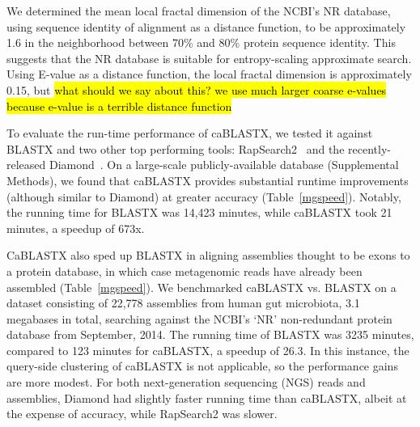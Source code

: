 \documentclass[review,preprint,12pt]{elsarticle}
\renewcommand{\cite}{\citep} %
\theoremstyle{definition}
\theoremstyle{remark}
\numberwithin{equation}{section}
\begin{document}
We determined the mean local fractal dimension of the NCBI's NR database, using 
sequence identity of alignment as a distance function, to be approximately 1.6 
in the neighborhood between 70\% and 80\% protein sequence identity.
This suggests that the NR database is suitable for entropy-scaling approximate
search.
Using E-value as a distance function, the local fractal dimension is 
approximately 0.15, but \hl{what should we say about this? we use much larger coarse e-values because e-value is a terrible distance function}

To evaluate the run-time performance of caBLASTX, we tested it against
BLASTX and two other top performing tools: RapSearch2~\cite{zhao2012rapsearch2} and the recently-released
Diamond~\cite{buchfink2014fast}.
On a large-scale publicly-available database (Supplemental Methods), we found that caBLASTX provides substantial runtime improvements 
(although similar to Diamond) at greater accuracy (Table~\ref{mgspeed}).
Notably, the running time for BLASTX was 14,423 minutes, 
while caBLASTX took 21 minutes, a speedup of 673x.

CaBLASTX also sped up BLASTX in aligning assemblies thought to be exons to a protein
database, in which case metagenomic reads have already been 
assembled (Table~\ref{mgspeed}).
We benchmarked caBLASTX vs. BLASTX on a dataset consisting of 22,778 assemblies
from human gut microbiota, 3.1 megabases in total, searching against the NCBI's
`NR' non-redundant protein database from September, 2014.
The running time of BLASTX was 3235 minutes, compared to 123 minutes for 
caBLASTX, a speedup of 26.3.
In this instance, the query-side clustering of caBLASTX is not applicable, so
the performance gains are more modest.
For both next-generation sequencing (NGS) reads and assemblies, Diamond had slightly faster running time than caBLASTX, albeit at the expense of accuracy, while RapSearch2 was slower.
\end{document}
